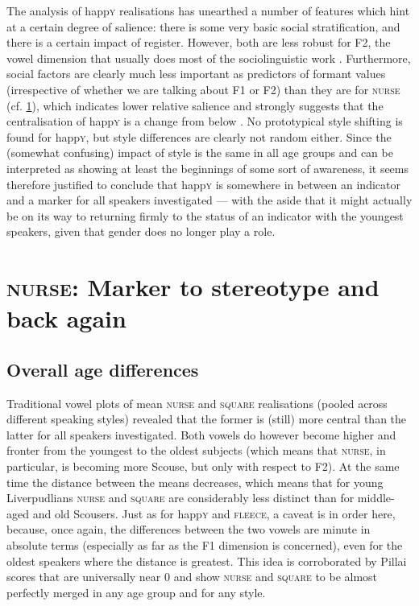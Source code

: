 The analysis of happ\textsc{y} realisations has unearthed a number of features which hint at a certain degree of salience: there is some very basic social stratification, and there is a certain impact of register.
However, both are less robust for F2, the vowel dimension that usually does most of the sociolinguistic work \parencite[cf.][502]{labov2006a}.
Furthermore, social factors are clearly much less important as predictors of formant values (irrespective of whether we are talking about F1 or F2) than they are for \textsc{nurse} (cf. \ref{prod.disc.nurse}), which indicates lower relative salience and strongly suggests that the centralisation of happ\textsc{y} is a change from below \parencite[cf.][78]{labov1994}.
No prototypical style shifting is found for happ\textsc{y}, but style differences are clearly not random either.
Since the (somewhat confusing) impact of style is the same in all age groups and can be interpreted as showing at least the beginnings of some sort of awareness, it seems therefore justified to conclude that happ\textsc{y} is somewhere in between an indicator and a marker for all speakers investigated --- with the aside that it might actually be on its way to returning firmly to the status of an indicator with the youngest speakers, given that gender does no longer play a role.

\section{\textrm{\textsc{nurse}}: Marker to stereotype and back again}
\label{prod.disc.nurse}

\subsection{Overall age differences}
\label{prod.disc.nurse.age}

Traditional vowel plots of mean \textsc{nurse} and \textsc{square} realisations (pooled across different speaking styles) revealed that the former is (still) more central than the latter for all speakers investigated.
Both vowels do however become higher and fronter from the youngest to the oldest subjects (which means that \textsc{nurse}, in particular, is becoming more Scouse, but only with respect to F2).
At the same time the distance between the means decreases, which means that for young Liverpudlians \textsc{nurse} and \textsc{square} are considerably less distinct than for middle-aged and old Scousers.
Just as for happ\textsc{y} and \textsc{fleece}, a caveat is in order here, because, once again, the differences between the two vowels are minute in absolute terms (especially as far as the F1 dimension is concerned), even for the oldest speakers where the distance is greatest.
This idea is corroborated by Pillai scores that are universally near 0 and show \textsc{nurse} and \textsc{square} to be almost perfectly merged in any age group and for any style.

